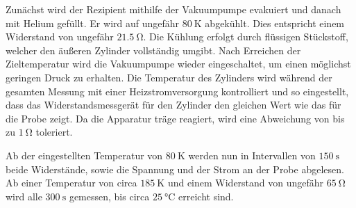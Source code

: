 Zunächst wird der Rezipient mithilfe der Vakuumpumpe evakuiert und danach mit Helium gefüllt. Er wird auf ungefähr $\SI{80}{\kelvin}$ abgekühlt. Dies entspricht einem Widerstand von ungefähr $\SI{21.5}{\ohm}$. Die Kühlung erfolgt durch flüssigen Stückstoff, welcher den äußeren Zylinder vollständig umgibt. Nach Erreichen der Zieltemperatur wird die Vakuumpumpe wieder eingeschaltet, um einen möglichst geringen Druck zu erhalten. Die Temperatur des Zylinders wird während der gesamten Messung mit einer Heizstromversorgung kontrolliert und so eingestellt, dass das Widerstandsmessgerät für den Zylinder den gleichen Wert wie das für die Probe zeigt. Da die Apparatur träge reagiert, wird eine Abweichung von bis zu $\SI{1}{\ohm}$ toleriert.

Ab der eingestellten Temperatur von $\SI{80}{\kelvin}$ werden nun in Intervallen von $\SI{150}{\second}$ beide Widerstände, sowie die Spannung und der Strom an der Probe abgelesen. Ab einer Temperatur von circa $\SI{185}{\kelvin}$ und einem Widerstand von ungefähr $\SI{65}{\ohm}$ wird alle $\SI{300}{\second}$ gemessen, bis circa $\SI{25}{\celsius}$ erreicht sind.
